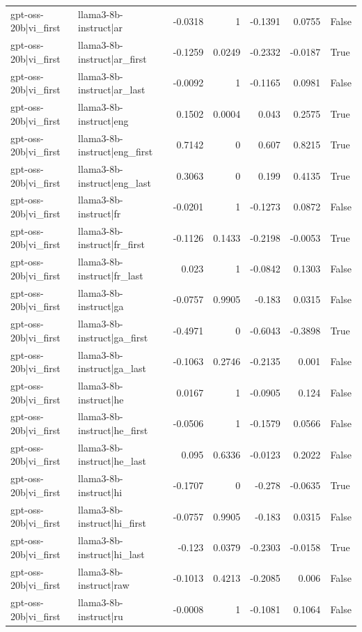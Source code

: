\begin{table}
\begin{tabular}{l l r r r r l}
gpt-oss-20b|vi_first & llama3-8b-instruct|ar & -0.0318 & 1 & -0.1391 & 0.0755 & False \\
gpt-oss-20b|vi_first & llama3-8b-instruct|ar_first & -0.1259 & 0.0249 & -0.2332 & -0.0187 & True \\
gpt-oss-20b|vi_first & llama3-8b-instruct|ar_last & -0.0092 & 1 & -0.1165 & 0.0981 & False \\
gpt-oss-20b|vi_first & llama3-8b-instruct|eng & 0.1502 & 0.0004 & 0.043 & 0.2575 & True \\
gpt-oss-20b|vi_first & llama3-8b-instruct|eng_first & 0.7142 & 0 & 0.607 & 0.8215 & True \\
gpt-oss-20b|vi_first & llama3-8b-instruct|eng_last & 0.3063 & 0 & 0.199 & 0.4135 & True \\
gpt-oss-20b|vi_first & llama3-8b-instruct|fr & -0.0201 & 1 & -0.1273 & 0.0872 & False \\
gpt-oss-20b|vi_first & llama3-8b-instruct|fr_first & -0.1126 & 0.1433 & -0.2198 & -0.0053 & True \\
gpt-oss-20b|vi_first & llama3-8b-instruct|fr_last & 0.023 & 1 & -0.0842 & 0.1303 & False \\
gpt-oss-20b|vi_first & llama3-8b-instruct|ga & -0.0757 & 0.9905 & -0.183 & 0.0315 & False \\
gpt-oss-20b|vi_first & llama3-8b-instruct|ga_first & -0.4971 & 0 & -0.6043 & -0.3898 & True \\
gpt-oss-20b|vi_first & llama3-8b-instruct|ga_last & -0.1063 & 0.2746 & -0.2135 & 0.001 & False \\
gpt-oss-20b|vi_first & llama3-8b-instruct|he & 0.0167 & 1 & -0.0905 & 0.124 & False \\
gpt-oss-20b|vi_first & llama3-8b-instruct|he_first & -0.0506 & 1 & -0.1579 & 0.0566 & False \\
gpt-oss-20b|vi_first & llama3-8b-instruct|he_last & 0.095 & 0.6336 & -0.0123 & 0.2022 & False \\
gpt-oss-20b|vi_first & llama3-8b-instruct|hi & -0.1707 & 0 & -0.278 & -0.0635 & True \\
gpt-oss-20b|vi_first & llama3-8b-instruct|hi_first & -0.0757 & 0.9905 & -0.183 & 0.0315 & False \\
gpt-oss-20b|vi_first & llama3-8b-instruct|hi_last & -0.123 & 0.0379 & -0.2303 & -0.0158 & True \\
gpt-oss-20b|vi_first & llama3-8b-instruct|raw & -0.1013 & 0.4213 & -0.2085 & 0.006 & False \\
gpt-oss-20b|vi_first & llama3-8b-instruct|ru & -0.0008 & 1 & -0.1081 & 0.1064 & False \\

\end{tabular}
\end{table}
